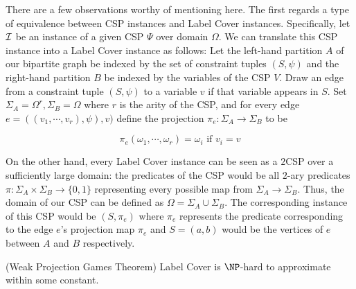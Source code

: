 There are a few observations worthy of mentioning here. The first regards a type of equivalence between CSP instances and Label Cover instances. Specifically, let $\mathcal{I}$ be an instance of a given CSP $\Psi$ over domain $\Omega$. We can translate this CSP instance into a Label Cover instance as follows: Let the left-hand partition $A$ of our bipartite graph be indexed by the set of constraint tuples $(S,\psi)$ and the right-hand partition $B$ be indexed by the variables of the CSP $V$. Draw an edge from a constraint tuple $(S,\psi)$ to a variable $v$ if that variable appears in $S$. Set $\Sigma_A = \Omega^r, \Sigma_B = \Omega$ where $r$ is the arity of the CSP, and for every edge $e = ((v_1,\cdots,v_r), \psi), v)$ define the projection $\pi_e:\Sigma_A \rightarrow \Sigma_B$ to be

\[ \pi_e(\omega_1, \cdots, \omega_r) =  \omega_i \text{ if } v_i = v\]\newline


On the other hand, every Label Cover instance can be seen as a $2$CSP over a sufficiently large domain: the predicates of the CSP would be all $2$-ary predicates $\pi:\Sigma_A \times \Sigma_B \rightarrow \{0,1\}$ representing every possible map from $\Sigma_A \rightarrow \Sigma_B$. Thus, the domain of our CSP can be defined as $\Omega = \Sigma_A \cup \Sigma_B$. The corresponding instance of this CSP would be $(S,\pi_e)$ where $\pi_e$ represents the predicate corresponding to the edge $e$'s projection map $\pi_e$ and $S = (a,b)$ would be the vertices of $e$ between $A$ and $B$ respectively.

\begin{theorem} (Weak Projection Games Theorem)
Label Cover is $\NP$-hard to approximate within some constant.
\end{theorem}



